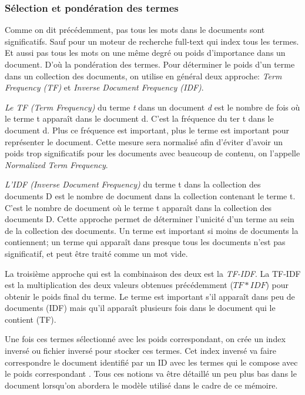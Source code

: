 \subsubsection{Sélection et pondération des termes}
Comme on dit précédemment, pas tous les mots dans le documents sont significatifs. Sauf pour un moteur de recherche full-text qui index tous les termes. Et aussi pas tous les mots on une même degré ou poids d'importance dans un document. D'où la pondération des termes. Pour déterminer le poids d'un terme dans un collection des documents, on utilise en général deux approche: \textit{Term Frequency (TF)} et \textit{Inverse Document Frequency (IDF)}.

\textit{Le TF (Term Frequency)} du terme \textit{t} dans un document \textit{d} est le nombre de fois où le terme t apparaît dans le document d. C'est la fréquence du ter t dans le document d. Plus ce fréquence est important, plus le terme est important pour représenter le document. Cette mesure sera normalisé afin d'éviter d'avoir un poids trop significatifs pour les documents avec beaucoup de contenu, on l'appelle \textit{Normalized Term Frequency}.

\textit{L'IDF (Inverse Document Frequency)} du terme t dans la collection des documents D est le nombre de document dans la collection contenant le terme t. C'est le nombre de document où le terme t apparaît dans la collection des documents D. Cette approche permet de déterminer l'unicité d'un terme au sein de la collection des documents. Un terme est important si moins de documents la contiennent; un terme qui apparaît dans presque tous les documents n'est pas significatif, et peut être traité comme un mot vide.

La troisième approche qui est la combinaison des deux est la \textit{TF-IDF}. La TF-IDF est la multiplication des deux valeurs obtenues précédemment ($TF*IDF$) pour obtenir le poids final du terme. Le terme est important s'il apparaît dans peu de documents (IDF) mais qu'il apparaît plusieurs fois dans le document qui le contient (TF).

Une fois ces termes sélectionné avec les poids correspondant, on crée un index inversé ou fichier inversé pour stocker ces termes. Cet index inversé va faire correspondre le document identifié par un ID avec les termes qui le compose avec le poids correspondant \citep*{vsm, vsm-for-arabic-language, sarch-engine-vsm, modern-ir}. Tous ces notions va être détaillé un peu plus bas dans le document lorsqu'on abordera le modèle utilisé dans le cadre de ce mémoire.

